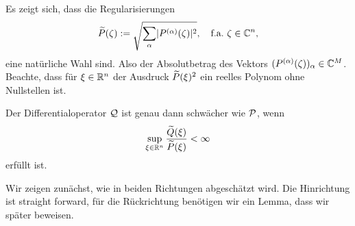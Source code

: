 Es zeigt sich, dass die Regularisierungen
\begin{equation}\label{eq:2:2}
\widetilde{P}(\zeta):=\sqrt{\sum_\alpha\lvert P^{(\alpha)}(\zeta)\rvert^2},
\quad\text{f.a.}~\zeta\in\mathbb C^n,
\end{equation}
eine natürliche Wahl sind.
Also der Absolutbetrag des Vektors $(P^{(\alpha)}(\zeta))_\alpha\in\mathbb C^M$.
Beachte, dass für $\xi\in\mathbb R^n$ der Ausdruck
$\widetilde{P}(\xi)^2$ ein reelles Polynom ohne Nullstellen ist.

\begin{thm}\label{thm:2:2.1}
Der Differentialoperator $\mathcal Q$ ist genau dann schwächer wie $\mathcal P$,
wenn
\begin{equation}\label{eq:thm:2:2.1}
\sup_{\xi\in\mathbb R^n}\frac{\widetilde{Q}(\xi)}{\widetilde{P}(\xi)}<\infty
\end{equation}
erfüllt ist.
\end{thm}

Wir zeigen zunächst, wie in beiden Richtungen abgeschätzt wird.
Die Hinrichtung ist straight forward,
für die Rückrichtung benötigen wir ein Lemma,
dass wir später beweisen.

